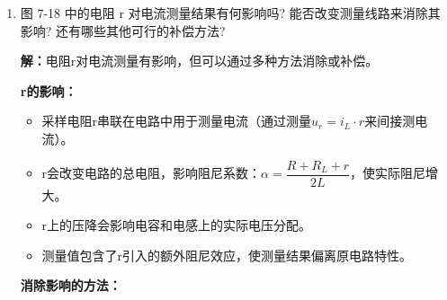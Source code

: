 \documentclass[12pt,a4paper]{article}
\begin{document}
\begin{enumerate}
\begin{itemize}
        \item 在无阻尼条件下（$\alpha = 0$），电路响应为：$u_c(t) = A\sin(\omega_0 t + \varphi)$，即理想LC电路会产生角频率为$\omega_0 = \dfrac{1}{\sqrt{LC}}$的等幅振荡。
        
        \item 能量在电感的磁场能和电容的电场能之间无损耗地来回转换。
    \end{itemize}
    
    \textbf{实际情况：}
    \begin{itemize}
        \item 实际电路中，电感线圈存在\textbf{内阻}$R_L$（铜线电阻），导线也有电阻。
        
        \item 实际阻尼系数：$\alpha = \dfrac{R_L}{2L} > 0$，电路仍有阻尼。
        
        \item 因此实际电路会出现\textbf{衰减振荡}而非等幅振荡，只是衰减速度较慢。
        
        \item 要实现真正的等幅振荡，需要引入\textbf{负阻尼}（如有源补偿电路）来抵消内阻的能量损耗。
    \end{itemize}
    
    \textbf{结论：}理想情况下会等幅振荡，但实际上由于元件固有损耗，只能实现接近等幅的缓慢衰减振荡。

    \item 图 7-18 中的电阻 r 对电流测量结果有何影响吗? 能否改变测量线路来消除其影响? 还有哪些其他可行的补偿方法?
    
    \textbf{解：}电阻r对电流测量有影响，但可以通过多种方法消除或补偿。
    
    \textbf{r的影响：}
    \begin{itemize}
        \item 采样电阻r串联在电路中用于测量电流（通过测量$u_r = i_L \cdot r$来间接测电流）。
        
        \item r会改变电路的总电阻，影响阻尼系数：$\alpha = \dfrac{R + R_L + r}{2L}$，使实际阻尼增大。
        
        \item r上的压降会影响电容和电感上的实际电压分配。
        
        \item 测量值包含了r引入的额外阻尼效应，使测量结果偏离原电路特性。
    \end{itemize}
    
    \textbf{消除影响的方法：}
    

\end{enumerate}
\end{document}
